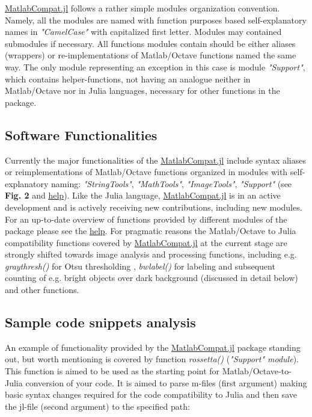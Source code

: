 \href{https://github.com/MatlabCompat/MatlabCompat.jl}{MatlabCompat.jl} follows a rather simple modules organization convention. Namely, all the modules are named with function purposes based self-explanatory names in \textit{"CamelCase"} with capitalized first letter. Modules may contained submodules if necessary. All functions modules contain should be either aliases (wrappers) or re-implementations of Matlab/Octave functions named the same way. The only module representing an exception in this case is module \textit{"Support"}, which contains helper-functions, not having an analogue neither in Matlab/Octave nor in Julia languages, necessary for other functions in the package.

\subsection{Software Functionalities}

Currently the major functionalities of the \href{https://github.com/MatlabCompat/MatlabCompat.jl}{MatlabCompat.jl} include syntax aliases or reimplementations of Matlab/Octave functions organized in modules with self-explanatory naming: \textit{"StringTools"}, \textit{"MathTools"}, \textit{"ImageTools"}, \textit{"Support"} (see \textbf{Fig. 2} and \href{http://matlabcompat.github.io/help.html}{help}). Like the Julia language, \href{https://github.com/MatlabCompat/MatlabCompat.jl}{MatlabCompat.jl} is in an active development and is actively receiving new contributions, including new modules. For an up-to-date overview of functions provided by different modules of the package please see the \href{http://matlabcompat.github.io/help.html}{help}. For pragmatic reasons the Matlab/Octave to Julia compatibility functions covered by \href{https://github.com/MatlabCompat/MatlabCompat.jl}{MatlabCompat.jl} at the current stage are strongly shifted towards image analysis and processing functions, including e.g. \textit{graythresh()} for Otsu thresholding \cite{otsu1975threshold}, \textit{bwlabel()} for labeling and subsequent counting of e.g. bright objects over dark background (discussed in detail below) and other functions.

\subsection{Sample code snippets analysis}

An example of functionality provided by the \href{https://github.com/MatlabCompat/MatlabCompat.jl}{MatlabCompat.jl} package standing out, but worth mentioning is covered by function \textit{rossetta()} (\textit{"Support" module}). This function is aimed to be used as the starting point for Matlab/Octave-to-Julia conversion of your code. It is aimed to parse m-files (first argument) making basic syntax changes required for the code compatibility to Julia and then save the jl-file (second argument) to the specified path:\\


